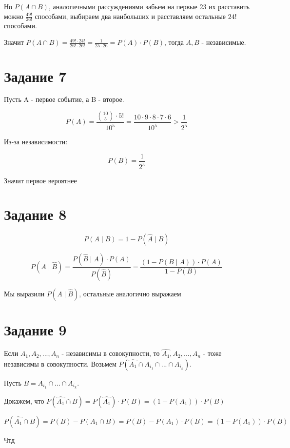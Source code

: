 \documentclass[a4paper]{article}
\newcommand{\task}[1]{\section*{Задание #1}}
\begin{document}
Но $P(A \cap B)$, аналогичными рассуждениями забьем на первые 23 их расставить можно
$\frac{49!}{26!}$ способами, выбираем два наибольших и расставляем остальные $24!$ способами.

Значит $P(A \cap B) = \frac{49! \cdot 24!}{26! \cdot 26!} = \frac{1}{25 \cdot 26} = P(A) \cdot P(B)$,
тогда $A, B$ - независимые.

\task{7}

Пусть A - первое событие, а B - второе.

$$P(A) = \frac{\binom{10}{5} \cdot 5!}{10^5} = \frac{10 \cdot 9 \cdot 8 \cdot 7 \cdot 6}{10^5} > \frac{1}{2^5}$$

Из-за независимости:

$$P(B) = \frac{1}{2^5}$$

Значит первое вероятнее

\task{8}

\begin{equation*}
    P(A \mid B) = 1 - P(\hat{A} \mid B)
\end{equation*}

\begin{equation*}
    P(A \mid \hat{B}) = \frac{P(\hat{B} \mid A) \cdot P(A)}{P(\hat{B})} = \frac{(1 - P(B \mid A)) \cdot P(A)}{1 - P(B)}
\end{equation*}

Мы выразили $P(A \mid \hat{B})$, остальные аналогично выражаем

\task{9}

Если $A_1, A_2, ..., A_n$ - независимы в совокупности, то $\hat{A_1}, A_2, ..., A_n$ - тоже
независимы в совокупности. Возьмем $P(\hat{A_1} \cap A_{i_1} \cap ... \cap A_{i_k})$.

Пусть $B = A_{i_1} \cap ... \cap A_{i_k}$.

Докажем, что $P(\hat{A_1} \cap B) = P(\hat{A_1}) \cdot P(B) = (1 - P(A_1)) \cdot P(B)$

$$P(\hat{A_1} \cap B) = P(B) - P(A_1 \cap B) = P(B) - P(A_1) \cdot P(B) = (1 - P(A_1)) \cdot P(B)$$

Чтд


\end{document}
